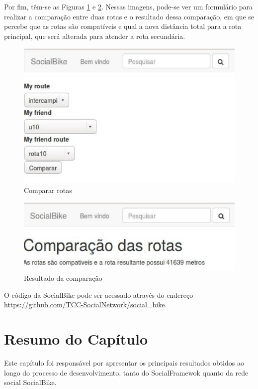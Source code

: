 Por fim, têm-se as Figuras \ref{comparar_rotas} e \ref{resultado_comparacao}. Nessas imagens, pode-se ver um formulário para realizar a comparação entre duas rotas e o resultado dessa comparação, em que se percebe que as rotas são compatíveis e qual a nova distância total para a rota principal, que será alterada para atender a rota secundária.

\begin{figure}[!h]
	\centering
	\includegraphics[scale=0.5]{figuras/resultados/comparar_rotas.eps}
	\caption[Comparar rotas]{Comparar rotas}
	\label{comparar_rotas}
\end{figure}

\begin{figure}[!h]
	\centering
	\includegraphics[scale=0.5]{figuras/resultados/resultado_comparacao.eps}
	\caption[Resultado da comparação]{Resultado da comparação}
	\label{resultado_comparacao}
\end{figure}

O código da SocialBike pode ser acessado através do endereço \url{https://github.com/TCC-SocialNetwork/social_bike}.

\section{Resumo do Capítulo}
Este capítulo foi responsável por apresentar os principais resultados obtidos ao longo do processo de desenvolvimento, tanto do SocialFramewok quanto da rede social SocialBike.

